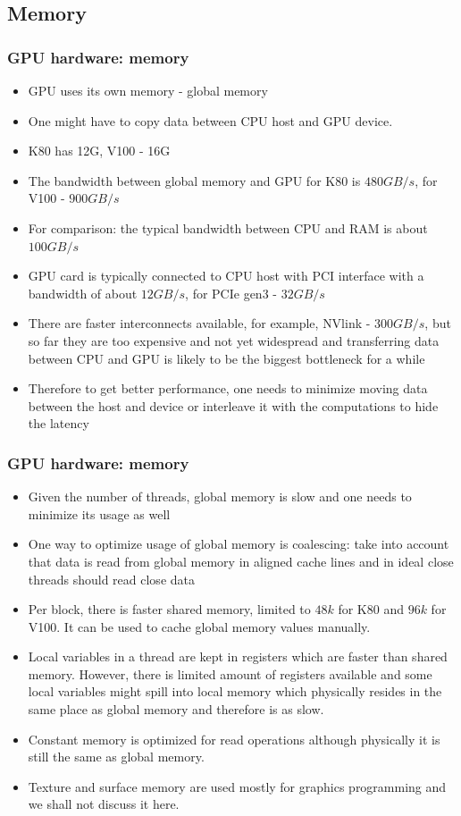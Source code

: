 \subsection{Memory}
\begin{frame}[fragile]
  \frametitle{GPU hardware: memory}
\begin{itemize}
\item GPU uses its own memory - {\color{mycolordef}global memory}
\item One might have to copy data between CPU host and GPU device.
\item K80 has 12G, V100 - 16G
\item The bandwidth between global memory and GPU for K80 is $480GB/s$, for V100 - $900GB/s$
\item For comparison: the typical bandwidth between CPU and RAM is about $100GB/s$
\item GPU card is typically connected to CPU host with PCI interface with a bandwidth of about $12GB/s$, for PCIe gen3 - $32GB/s$
\item There are faster interconnects  available, for example, {\color{mycolordef}NVlink} - $300GB/s$, but so far they are too expensive and not
  yet widespread and transferring data between CPU and GPU is likely to be the biggest bottleneck for a while
\item Therefore to get better performance, one needs to minimize moving data between the host and device or interleave it with the computations to hide the latency

\end{itemize}
\end{frame}


\begin{frame}[fragile]
  \frametitle{GPU hardware: memory}
\begin{itemize}
\item Given the number of threads, global memory is slow and one needs to minimize its usage as well
\item One way to optimize usage of global memory is {\color{mycolordef}coalescing}: take into account that data is read from global memory in {\color{mycolordef} aligned cache lines} and in ideal close threads should read close data
\item Per block, there is faster {\color{mycolordef}shared memory}, limited to $48k$ for K80 and $96k$ for V100. It can be used to cache global memory values manually.
\item Local variables in a thread are kept in {\color{mycolordef}registers} which are faster than shared memory. 
  However, there is limited amount of registers available and some local variables might spill into {\color{mycolordef}local memory} which physically resides in the same place as global
  memory and therefore is as slow.
\item {\color{mycolordef}Constant memory} is optimized for read operations although physically it is still the same as global memory.
\item {\color{mycolordef}Texture and surface memory} are used mostly for graphics programming and we shall not discuss it here.
\end{itemize}
\end{frame}


